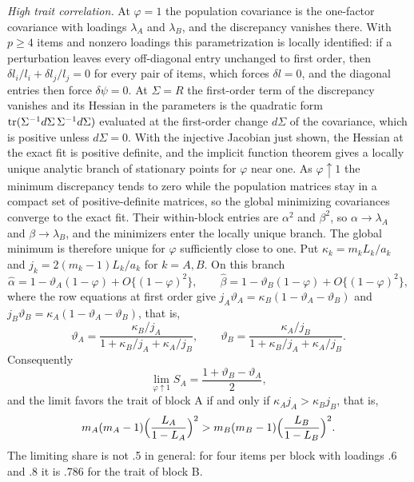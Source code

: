 \textit{High trait correlation.} At $\varphi=1$ the population covariance is the one-factor covariance with loadings $\lambda_A$ and $\lambda_B$, and the discrepancy vanishes there. With $p\ge4$ items and nonzero loadings this parametrization is locally identified: if a perturbation leaves every off-diagonal entry unchanged to first order, then $\delta l_i/l_i+\delta l_j/l_j=0$ for every pair of items, which forces $\delta l=0$, and the diagonal entries then force $\delta\psi=0$. At $\Sigma=R$ the first-order term of the discrepancy vanishes and its Hessian in the parameters is the quadratic form $\operatorname{tr}(\Sigma^{-1}d\Sigma\,\Sigma^{-1}d\Sigma)$ evaluated at the first-order change $d\Sigma$ of the covariance, which is positive unless $d\Sigma=0$. With the injective Jacobian just shown, the Hessian at the exact fit is positive definite, and the implicit function theorem gives a locally unique analytic branch of stationary points for $\varphi$ near one. As $\varphi\uparrow1$ the minimum discrepancy tends to zero while the population matrices stay in a compact set of positive-definite matrices, so the global minimizing covariances converge to the exact fit. Their within-block entries are $\alpha^2$ and $\beta^2$, so $\alpha\to\lambda_A$ and $\beta\to\lambda_B$, and the minimizers enter the locally unique branch. The global minimum is therefore unique for $\varphi$ sufficiently close to one. Put $\kappa_k=m_kL_k/a_k$ and $j_k=2(m_k-1)L_k/a_k$ for $k=A,B$. On this branch
\[
\hat\alpha=1-\vartheta_A(1-\varphi)+O\{(1-\varphi)^2\},\qquad
\hat\beta=1-\vartheta_B(1-\varphi)+O\{(1-\varphi)^2\},
\]
where the row equations at first order give $j_A\vartheta_A=\kappa_B(1-\vartheta_A-\vartheta_B)$ and $j_B\vartheta_B=\kappa_A(1-\vartheta_A-\vartheta_B)$, that is,
\[
\vartheta_A=\frac{\kappa_B/j_A}{1+\kappa_B/j_A+\kappa_A/j_B},\qquad
\vartheta_B=\frac{\kappa_A/j_B}{1+\kappa_B/j_A+\kappa_A/j_B} .
\]
Consequently
\[
\lim_{\varphi\uparrow1}S_A=\frac{1+\vartheta_B-\vartheta_A}2 ,
\]
and the limit favors the trait of block A if and only if $\kappa_Aj_A>\kappa_Bj_B$, that is,
\[
m_A(m_A-1)\Bigl(\frac{L_A}{1-L_A}\Bigr)^2>m_B(m_B-1)\Bigl(\frac{L_B}{1-L_B}\Bigr)^2 .
\]
The limiting share is not .5 in general: for four items per block with loadings .6 and .8 it is .786 for the trait of block B.

